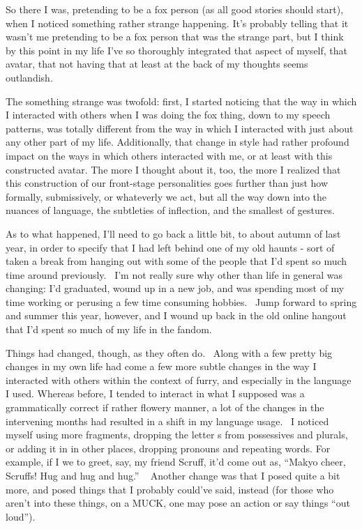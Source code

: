 So there I was, pretending to be a fox person (as all good stories
should start), when I noticed something rather strange happening. It's
probably telling that it wasn't me pretending to be a fox person that
was the strange part, but I think by this point in my life I've so
thoroughly integrated that aspect of myself, that avatar, that not
having that at least at the back of my thoughts seems outlandish.

The something strange was twofold: first, I started noticing that the
way in which I interacted with others when I was doing the fox thing,
down to my speech patterns, was totally different from the way in which
I interacted with just about any other part of my life. Additionally,
that change in style had rather profound impact on the ways in which
others interacted with me, or at least with this constructed avatar. The
more I thought about it, too, the more I realized that this construction
of our front-stage personalities goes further than just how formally,
submissively, or whateverly we act, but all the way down into the
nuances of language, the subtleties of inflection, and the smallest of
gestures.

As to what happened, I'll need to go back a little bit, to about autumn
of last year, in order to specify that I had left behind one of my old
haunts - sort of taken a break from hanging out with some of the people
that I'd spent so much time around previously. ~I'm not really sure why
other than life in general was changing: I'd graduated, wound up in a
new job, and was spending most of my time working or perusing a few time
consuming hobbies. ~Jump forward to spring and summer this year,
however, and I wound up back in the old online hangout that I'd spent so
much of my life in the fandom.

Things had changed, though, as they often do. ~Along with a few pretty
big changes in my own life had come a few more subtle changes in the way
I interacted with others within the context of furry, and especially in
the language I used. Whereas before, I tended to interact in what I
supposed was a grammatically correct if rather flowery manner, a lot of
the changes in the intervening months had resulted in a shift in my
language usage. ~I noticed myself using more fragments, dropping the
letter s from possessives and plurals, or adding it in in other places,
dropping pronouns and repeating words. For example, if I we to greet,
say, my friend Scruff, it'd come out as, ``Makyo cheer, Scruffs! Hug and
hug and hug.'' ~ Another change was that I posed quite a bit more, and
posed things that I probably could've said, instead (for those who
aren't into these things, on a MUCK, one may pose an action or say
things ``out loud'').


